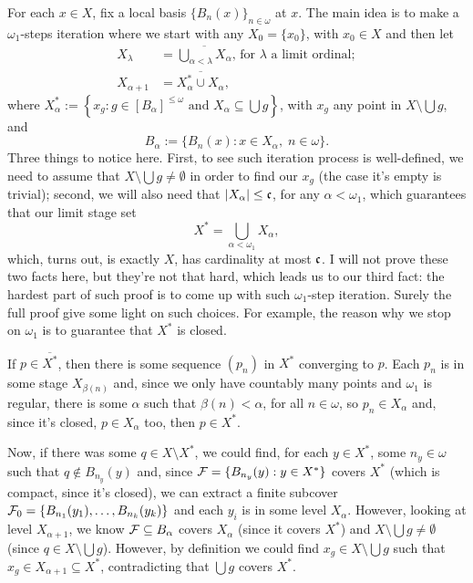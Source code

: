 \begin{sketch}
    For each $x\in X$, fix a local basis $\{B_n(x)\}_{n\in\omega}$ at $x$. The main idea is to make a $\omega_1$-steps iteration where we start with any $X_0=\{x_0\}$, with $x_0\in X$ and then let
    \begin{align*}
        X_\lambda & = \overline{\bigcup_{\alpha<\lambda}X_\alpha}\text{, for $\lambda$ a limit ordinal};\\
        X_{\alpha+1} & = \overline{X_\alpha^*\cup X_\alpha},
    \end{align*}
    where $X_\alpha^*:=\left\{x_g:g\in[B_\alpha]^{\leq\omega}\text{ and }X_\alpha\subseteq\bigcup g\right\}$, with $x_g$ any point in $X\setminus\bigcup g$, and
    $$B_\alpha:=\{B_n(x):x\in X_\alpha,\;n\in\omega\}.$$
    Three things to notice here. First, to see such iteration process is well-defined, we need to assume that $X\setminus\bigcup g\neq\emptyset$ in order to find our $x_g$ (the case it's empty is trivial); second, we will also need that $\lvert X_\alpha\rvert\leq\mathfrak{c}$, for any $\alpha<\omega_1$, which guarantees that our limit stage set
    $$X^*=\bigcup_{\alpha<\omega_1}X_\alpha,$$
    which, turns out, is exactly $X$, has cardinality at most $\mathfrak{c}$. I will not prove these two facts here, but they're not that hard, which leads us to our third fact: the hardest part of such proof is to come up with such $\omega_1$-step iteration. Surely the full proof give some light on such choices. For example, the reason why we stop on $\omega_1$ is to guarantee that $X^*$ is closed.

    If $p\in\overline{X^*}$, then there is some sequence $(p_n)$ in $X^*$ converging to $p$. Each $p_n$ is in some stage $X_{\beta(n)}$ and, since we only have countably many points and $\omega_1$ is regular, there is some $\alpha$ such that $\beta(n)<\alpha$, for all $n\in\omega$, so $p_n\in X_\alpha$ and, since it's closed, $p\in X_\alpha$ too, then $p\in X^*$.

    Now, if there was some $q\in X\setminus X^*$, we could find, for each $y\in X^*$, some $n_y\in\omega$ such that $q\notin B_{n_y}(y)$ and, since $\mathcal{F}=\{B_{n_y}(y):y\in X^*\}$ covers $X^*$ (which is compact, since it's closed), we can extract a finite subcover $\mathcal{F}_0=\{B_{n_1}(y_1),\dots,B_{n_k}(y_k)\}$ and each $y_i$ is in some level $X_\alpha$. However, looking at level $X_{\alpha+1}$, we know $\mathcal{F}\subseteq B_\alpha$ covers $X_\alpha$ (since it covers $X^*$) and $X\setminus\bigcup g\neq\emptyset$ (since $q\in X\setminus\bigcup g$). However, by definition we could find $x_g\in X\setminus\bigcup g$ such that $x_g\in X_{\alpha+1}\subseteq X^*$, contradicting that $\bigcup g$ covers $X^*$.
\end{sketch}

